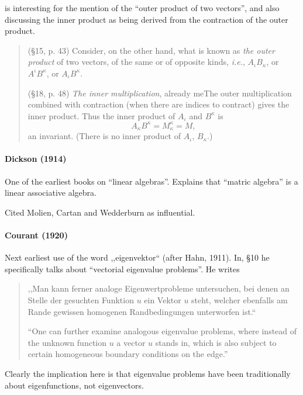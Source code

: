 \cite{Silberstein1922} is interesting for the mention of the ``outer product of two vectors'', and also discussing the inner product as being derived from the contraction of the outer product.
\begin{quote}
(\S 15, p. 43) Consider, on the other hand, what is known as \textit{the outer product} of two vectors, of the same or of opposite kinds, \textit{i.e.}, $A_\iota B_\kappa$, or $A^\iota B^\kappa$, or $A_\iota B^\kappa$.

(\S 18, p. 48) \textit{The inner multiplication}, already meThe outer multiplication combined with contraction (when there are indices to contract) gives the inner product. Thus the inner product of $A_\iota$ and $B^\kappa$ is
\[
A_\kappa B^\kappa = M^\kappa_\kappa = M,
\]
an invariant. (There is no inner product of $A_\iota$, $B_\kappa$.)
\end{quote}



\paragraph{Dickson (1914)~\cite{Dickson1914}}

One of the earliest books on ``linear algebras''.
Explains that ``matric algebra'' is a linear associative algebra.

Cited Molien, Cartan and Wedderburn as influential.


\paragraph{Courant (1920)~\cite{Courant1920}}

Next earliest use of the word ,,eigenvektor`` (after Hahn, 1911).
In, \S 10 he specifically talks about ``vectorial eigenvalue problems''. He
writes

\begin{quote}
,,Man kann ferner analoge Eigenwertprobleme untersuchen, bei denen an Stelle
der gesuchten Funktion $u$ ein Vektor $u$ steht, welcher ebenfalls am Rande
gewissen homogenen Randbedingungen unterworfen ist.``

``One can further examine analogous eigenvalue problems, where instead of the
unknown function $u$ a vector $u$ stands in, which is also subject to certain
homogeneous boundary conditions on the edge.''
\end{quote}

Clearly the implication here is that eigenvalue problems have been
traditionally about eigenfunctions, not eigenvectors.



